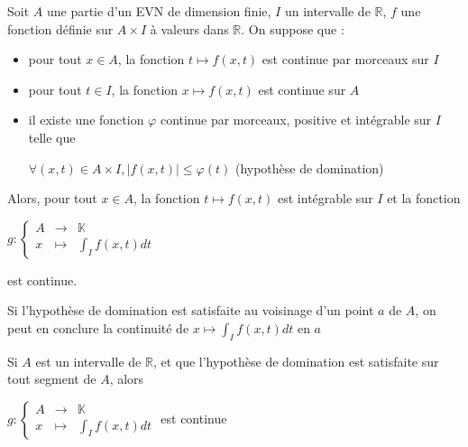\documentclass[a4paper,12pt]{book}
\newcommand{\Thr}[2]{\begin{tcolorbox}[sharp corners, colback=white,colframe=red!90!black!75, title=Théorème : #1]#2\end{tcolorbox}}
\newcommand{\Prop}[2]{\begin{tcolorbox}[sharp corners, colback=white,colframe=red!90!black!75, title=Proposition : #1]#2\end{tcolorbox}}
\def\R{\mathbb{R}}
\def\K{\mathbb{K}}
\begin{document}
\Thr{Continuité dominée }{Soit $A$ une partie d'un EVN de dimension finie, $I$ un intervalle de $\R$, $f$ une fonction définie sur $A\times I$ à valeurs dans $\R$. On suppose que :\begin{itemize}
\item pour tout $x\in A$, la fonction $t\mapsto f(x,t)$ est continue par morceaux sur $I$
\item pour tout $t\in I$, la fonction $x\mapsto f(x,t)$ est continue sur $A$
\item il existe une fonction $\varphi$ continue par morceaux, positive et intégrable sur $I$ telle que \par \begin{center}$\forall (x,t)\in A\times I, \vert f(x,t)\vert\leq \varphi(t)$ (hypothèse de domination) \end{center}
\end{itemize}
Alors, pour tout $x\in A$, la fonction $t\mapsto f(x,t)$ est intégrable sur $I$ et la fonction \par \begin{center} $g:\left\{\begin{array}{rcl}A & \to & \K \\ x & \mapsto & \int_If(x,t)dt\end{array}\right.$\end{center} \par est continue.}
\Prop{Extension}{Si l'hypothèse de domination est satisfaite au voisinage d'un point $a$ de $A$, on peut en conclure la continuité de $x\mapsto \int_If(x,t)dt$ en $a$ \par Si $A$ est un intervalle de $\R$, et que l'hypothèse de domination est satisfaite sur tout segment de $A$, alors \par \begin{center} $g:\left\{\begin{array}{rcl}A&\to&\K\\x&\mapsto&\int_If(x,t)dt\end{array}\right.$ est continue\end{center}}
\end{document}
